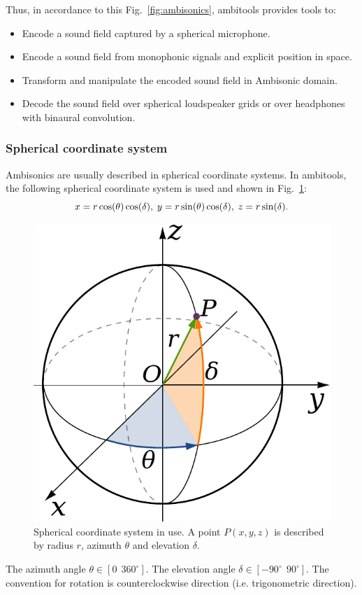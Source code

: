\documentclass[10pt,a4paper]{article}
\begin{document}
Thus, in accordance to this Fig.~\ref{fig:ambisonics}, ambitools provides tools to:
\begin{itemize}
\item Encode a sound field captured by a spherical microphone.
\item Encode a sound field from monophonic signals and explicit position in space.
\item Transform and manipulate the encoded sound field in Ambisonic domain.
\item Decode the sound field over spherical loudspeaker grids or over headphones with binaural convolution.
\end{itemize}

\subsubsection{Spherical coordinate system}
\label{sec:spherical_coordinates}
Ambisonics are usually described in spherical coordinate systems. In ambitools, the following spherical coordinate system is used and shown in Fig.~\ref{fig:coord_sph}:
\begin{equation}
x = r \cos(\theta) \cos(\delta), \; y = r \sin(\theta) \cos(\delta), \;
z = r \sin(\delta)\textcolor{red}{.}
\end{equation}
\begin{figure}[!ht]
\centering
\includegraphics[height=0.3\columnwidth]{Fig_Coord_Sph.pdf}
\caption{Spherical coordinate system in use. A point $P (x,y,z)$ is described by radius $r$, azimuth $\theta$ and elevation $\delta$.}
\label{fig:coord_sph}
\end{figure}
The azimuth angle $\theta \in [0~~360^\circ]$. The elevation angle $\delta \in [-90^\circ~~90^\circ]$. The convention for rotation is counterclockwise direction (i.e. trigonometric direction).
\end{document}
